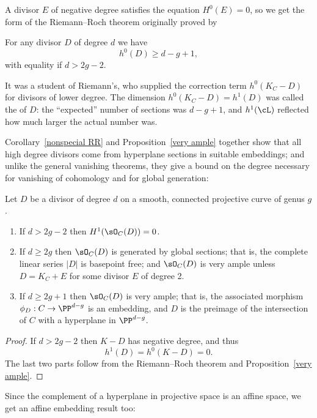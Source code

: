 A divisor $E$
of negative degree 
satisfies the equation
$H^0(E) = 0$,
so we get the form of the Riemann--Roch theorem
originally proved by 
%

\begin{corollary}\label{nonspecial RR}
For any divisor $D$ of degree $d$ we have
$$
h^0(D) \geq d - g + 1,
$$
with equality if $d > 2g-2$.
\end{corollary}
%
It was 
%
a student of
Riemann's, 
who supplied the correction term $h^0(K_C - D)$ for divisors of lower degree.
The dimension $h^0(K_C-D) = h^1(D)$ was called the 
%
of $D$: the ``expected'' number of sections was $d-g+1$, and $h^1(\cL)$ reflected how much larger the actual number was.

Corollary~\ref{nonspecial RR} and Proposition~\ref{very ample} together show that all high degree divisors come from hyperplane sections in 
suitable embeddings; and unlike the general vanishing theorems, they give a bound on the degree necessary for vanishing
of cohomology and for
global generation:

\begin{corollary}\label{degree 2g+1 embedding}
Let $D$ be a divisor of degree $d$ on a smooth, connected projective curve of genus $g$.
\begin{enumerate}
 \item If $d>2g-2$ then $H^1(\sO_C(D)) = 0$.
 \item If $d \geq 2g$ then $\sO_C(D)$ is generated by global sections; that is, the complete linear series $|D|$ is basepoint free; and $\sO_C(D)$ is very ample unless $D = K_{C}+E$ for some divisor $E$ of degree 2.
 \item If $d \geq 2g+1$ then $\sO_C(D)$ is very ample; that is, the associated morphism $\phi_D : C \to \PP^{d-g}$ is an embedding, and
$D$ is the preimage of the intersection of $C$ with a hyperplane in $ \PP^{d-g}$.
\end{enumerate}
\end{corollary}

\begin{proof}
If $d>2g-2$ then $K-D$ has negative degree, and thus 
$$h^1(D) = h^0(K-D) = 0. $$ 
The last two parts follow
from the Riemann--Roch theorem and Proposition~\ref{very ample}.
\end{proof}

Since the complement of a hyperplane in projective space is an affine space, we get an affine embedding result too:

